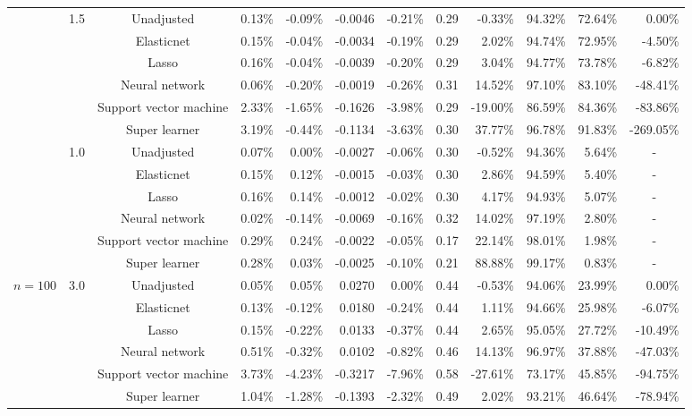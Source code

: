 \documentclass{article}
\begin{document}
\begin{center}
\begin{table}[!ht]
\begin{tabular*}{\textwidth}{@{\extracolsep\fill}c|c|c|rrrr|rrrrr}
        ~ & \multirow{6}{*}{1.5} & Unadjusted & 0.13\% & -0.09\% & -0.0046 & -0.21\% & 0.29 & -0.33\% & 94.32\% & 72.64\% & 0.00\% \\ 
        ~ & ~ & Elasticnet & 0.15\% & -0.04\% & -0.0034 & -0.19\% & 0.29 & 2.02\% & 94.74\% & 72.95\% & -4.50\% \\ 
        ~ & ~ & Lasso & 0.16\% & -0.04\% & -0.0039 & -0.20\% & 0.29 & 3.04\% & 94.77\% & 73.78\% & -6.82\% \\ 
        ~ & ~ & Neural network & 0.06\% & -0.20\% & -0.0019 & -0.26\% & 0.31 & 14.52\% & 97.10\% & 83.10\% & -48.41\% \\ 
        ~ & ~ & Support vector machine & 2.33\% & -1.65\% & -0.1626 & -3.98\% & 0.29 & -19.00\% & 86.59\% & 84.36\% & -83.86\% \\ 
        ~ & ~ & Super learner & 3.19\% & -0.44\% & -0.1134 & -3.63\% & 0.30 & 37.77\% & 96.78\% & 91.83\% & -269.05\% \\      \cline{2-12}
        
        ~ & \multirow{6}{*}{1.0} & Unadjusted & 0.07\% & 0.00\% & -0.0027 & -0.06\% & 0.30 & -0.52\% & 94.36\% & 5.64\% & \multicolumn{1}{c}{-} \\ 
        ~ & ~ & Elasticnet & 0.15\% & 0.12\% & -0.0015 & -0.03\% & 0.30 & 2.86\% & 94.59\% & 5.40\% & \multicolumn{1}{c}{-} \\ 
        ~ & ~ & Lasso & 0.16\% & 0.14\% & -0.0012 & -0.02\% & 0.30 & 4.17\% & 94.93\% & 5.07\% & \multicolumn{1}{c}{-} \\ 
        ~ & ~ & Neural network & 0.02\% & -0.14\% & -0.0069 & -0.16\% & 0.32 & 14.02\% & 97.19\% & 2.80\% & \multicolumn{1}{c}{-} \\ 
        ~ & ~ & Support vector machine & 0.29\% & 0.24\% & -0.0022 & -0.05\% & 0.17 & 22.14\% & 98.01\% & 1.98\% & \multicolumn{1}{c}{-} \\ 
        ~ & ~ & Super learner & 0.28\% & 0.03\% & -0.0025 & -0.10\% & 0.21 & 88.88\% & 99.17\% & 0.83\% & \multicolumn{1}{c}{-} \\         \hline



         \multirow{18}{*}{$n = 100$} & \multirow{6}{*}{3.0} & Unadjusted & 0.05\% & 0.05\% & 0.0270 & 0.00\% & 0.44 & -0.53\% & 94.06\% & 23.99\% & 0.00\% \\ 
        ~ & ~ & Elasticnet & 0.13\% & -0.12\% & 0.0180 & -0.24\% & 0.44 & 1.11\% & 94.66\% & 25.98\% & -6.07\% \\ 
        ~ & ~ & Lasso & 0.15\% & -0.22\% & 0.0133 & -0.37\% & 0.44 & 2.65\% & 95.05\% & 27.72\% & -10.49\% \\ 
        ~ & ~ & Neural network & 0.51\% & -0.32\% & 0.0102 & -0.82\% & 0.46 & 14.13\% & 96.97\% & 37.88\% & -47.03\% \\ 
        ~ & ~ & Support vector machine & 3.73\% & -4.23\% & -0.3217 & -7.96\% & 0.58 & -27.61\% & 73.17\% & 45.85\% & -94.75\% \\ 
        ~ & ~ & Super learner & 1.04\% & -1.28\% & -0.1393 & -2.32\% & 0.49 & 2.02\% & 93.21\% & 46.64\% & -78.94\% \\       \cline{2-12}
        

\end{tabular*}
\end{table}
\end{center}
\end{document}
